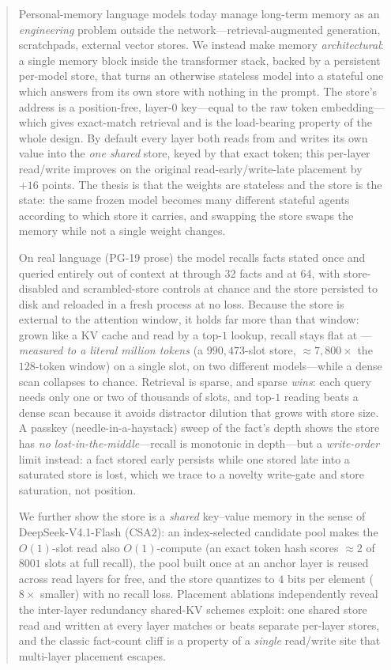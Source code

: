 \begin{abstract}
Personal-memory language models today manage long-term memory as an
\emph{engineering} problem outside the network---retrieval-augmented generation,
scratchpads, external vector stores. We instead make memory \emph{architectural}:
a single memory block inside the transformer stack, backed by a persistent
per-model store, that turns an otherwise stateless model into a stateful one which
answers from its own store with nothing in the prompt. The store's address is a
position-free, layer-0 key---equal to the raw token embedding---which gives
exact-match retrieval and is the load-bearing property of the whole design. By
default every layer both reads from and writes its own value into the \emph{one
shared} store, keyed by that exact token; this per-layer read/write improves on the
original read-early/write-late placement by $+16$ points. The thesis is that the
weights are stateless and the store is the state: the same frozen model becomes many
different stateful agents according to which store it carries, and swapping the store
swaps the memory while not a single weight changes.

On real language (PG-19 prose) the model recalls facts stated once and queried
entirely out of context at  through 32 facts and  at 64,
with store-disabled and scrambled-store controls at chance and the store persisted
to disk and reloaded in a fresh process at no loss. Because the store is external to
the attention window, it holds far more than that window: grown like a KV cache and
read by a top-$1$ lookup, recall stays flat at ---\emph{measured to a
literal million tokens} (a $990{,}473$-slot store, $\approx\!7{,}800\times$ the
$128$-token window) on a single slot, on two different models---while a dense scan
collapses to chance. Retrieval is sparse, and sparse \emph{wins}: each query needs
only one or two of thousands of slots, and top-$1$ reading beats a dense scan because
it avoids distractor dilution that grows with store size. A passkey
(needle-in-a-haystack) sweep of the fact's depth shows the store has \emph{no
lost-in-the-middle}---recall is monotonic in depth---but a \emph{write-order} limit
instead: a fact stored early persists while one stored late into a saturated store is
lost, which we trace to a novelty write-gate and store saturation, not position.

We further show the store is a \emph{shared} key--value memory in the sense of
DeepSeek-V4.1-Flash (CSA2): an index-selected candidate pool makes the
$O(1)$-slot read also $O(1)$-compute (an exact token hash scores $\approx\!2$ of
$8001$ slots at full recall), the pool built once at an anchor layer is reused
across read layers for free, and the store quantizes to $4$ bits per element
($8\times$ smaller) with no recall loss. Placement ablations independently reveal
the inter-layer redundancy shared-KV schemes exploit: one shared store read and
written at every layer matches or beats separate per-layer stores, and the classic
fact-count cliff is a property of a \emph{single} read/write site that multi-layer
placement escapes.


\end{abstract}
